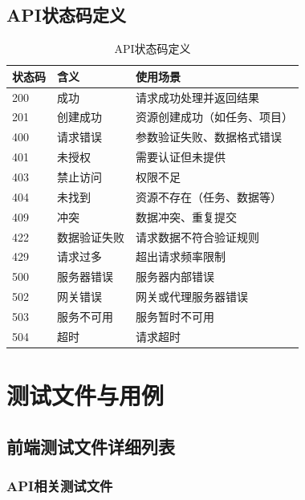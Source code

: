 \documentclass[12pt,a4paper,openany]{report}
\begin{document}
\section{API状态码定义}

\begin{table}[h]
\centering
\caption{API状态码定义}
\begin{tabular}{|l|l|l|}
\hline
\textbf{状态码} & \textbf{含义} & \textbf{使用场景} \\
\hline
200 & 成功 & 请求成功处理并返回结果 \\
201 & 创建成功 & 资源创建成功（如任务、项目） \\
400 & 请求错误 & 参数验证失败、数据格式错误 \\
401 & 未授权 & 需要认证但未提供 \\
403 & 禁止访问 & 权限不足 \\
404 & 未找到 & 资源不存在（任务、数据等） \\
409 & 冲突 & 数据冲突、重复提交 \\
422 & 数据验证失败 & 请求数据不符合验证规则 \\
429 & 请求过多 & 超出请求频率限制 \\
500 & 服务器错误 & 服务器内部错误 \\
502 & 网关错误 & 网关或代理服务器错误 \\
503 & 服务不可用 & 服务暂时不可用 \\
504 & 超时 & 请求超时 \\
\hline
\end{tabular}
\end{table}

\chapter{测试文件与用例}

\section{前端测试文件详细列表}

\subsection{API相关测试文件}
\end{document}
